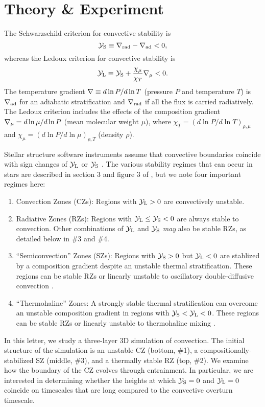 \section{Theory \& Experiment}
\label{sec:theory}
The Schwarzschild criterion for convective stability is
\begin{equation}
    \yS \equiv \gradrad - \gradad < 0,
    \label{eqn:yS}
\end{equation}
whereas the Ledoux criterion for convective stability is
\begin{equation}
    \yL \equiv \yS +  \frac{\chi_\mu}{\chi_T}\gradmu < 0.
    \label{eqn:yL}
\end{equation}
The temperature gradient $\nabla \equiv d \ln P / d \ln T$ (pressure $P$ and temperature $T$) is $\nabla_{\rm{ad}}$ for an adiabatic stratification and $\nabla_{\rm{rad}}$ if all the flux is carried radiatively.
The Ledoux criterion includes the effects of the composition gradient $\nabla_{\mu} = d\ln\mu/d\ln P$ (mean molecular weight $\mu$), where $\chi_T = (d\ln P / d\ln T)_{\rho,\mu}$ and $\chi_\mu = (d\ln P / d\ln\mu)_{\rho,T}$ (density $\rho$).

Stellar structure software instruments assume that convective boundaries coincide with sign changes of $\mathcal{Y}_{\rm{L}}$ or $\mathcal{Y}_{\rm{S}}$ \citep[][sec.~2]{mesa4}.
The various stability regimes that can occur in stars are described in section 3 and figure 3 of \citet{salaris_cassisi_2017}, but we note four important regimes here:
\begin{enumerate}
    \item Convection Zones (CZs): Regions with ${\mathcal{Y}_{\rm{L}} > 0}$ are convectively unstable.
    \item Radiative Zones (RZs): Regions with $\mathcal{Y}_{\rm{L}} \leq \mathcal{Y}_{\rm{S}} < 0$ are always stable to convection.
        Other combinations of $\mathcal{Y}_{\rm{L}}$ and $\mathcal{Y}_{\rm{S}}$ \emph{may} also be stable RZs, as detailed below in \#3 and \#4.
    \item ``Semiconvection'' Zones (SZs): Regions with ${\mathcal{Y}_{\rm{S}} > 0}$ but $\mathcal{Y}_{\rm{L}} < 0$ are stablized by a composition gradient despite an unstable thermal stratification.
        These regions can be stable RZs or linearly unstable to oscillatory double-diffusive convection \citep[ODDC, see][chapters 2 and 4]{garaud_2018}.
    \item ``Thermohaline'' Zones: A strongly stable thermal stratification can overcome an unstable composition gradient in regions with $\mathcal{Y}_{\rm{S}} < \mathcal{Y}_{\rm{L}} < 0$.
        These regions can be stable RZs or linearly unstable to thermohaline mixing \citep[see][chapters 2 and 3]{garaud_2018}.
\end{enumerate}
In this letter, we study a three-layer 3D simulation of convection.
The initial structure of the simulation is an unstable CZ (bottom, \#1), a compositionally-stabilized SZ (middle, \#3), and a thermally stable RZ (top, \#2).
We examine how the boundary of the CZ evolves through entrainment.
In particular, we are interested in determining whether the heights at which $\mathcal{Y}_{\rm{S}} = 0$ and $\mathcal{Y}_{\rm{L}} = 0$ coincide on timescales that are long compared to the convective overturn timescale.

